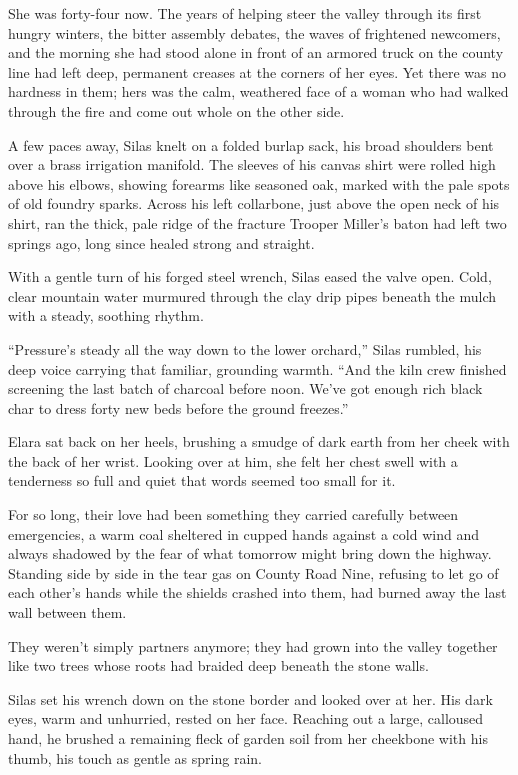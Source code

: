 She was forty-four now. The years of helping steer the valley through its first hungry winters, the bitter assembly debates, the waves of frightened newcomers, and the morning she had stood alone in front of an armored truck on the county line had left deep, permanent creases at the corners of her eyes. Yet there was no hardness in them; hers was the calm, weathered face of a woman who had walked through the fire and come out whole on the other side.

A few paces away, Silas knelt on a folded burlap sack, his broad shoulders bent over a brass irrigation manifold. The sleeves of his canvas shirt were rolled high above his elbows, showing forearms like seasoned oak, marked with the pale spots of old foundry sparks. Across his left collarbone, just above the open neck of his shirt, ran the thick, pale ridge of the fracture Trooper Miller’s baton had left two springs ago, long since healed strong and straight.

With a gentle turn of his forged steel wrench, Silas eased the valve open. Cold, clear mountain water murmured through the clay drip pipes beneath the mulch with a steady, soothing rhythm.

``Pressure’s steady all the way down to the lower orchard,'' Silas rumbled, his deep voice carrying that familiar, grounding warmth. ``And the kiln crew finished screening the last batch of charcoal before noon. We’ve got enough rich black char to dress forty new beds before the ground freezes.''

Elara sat back on her heels, brushing a smudge of dark earth from her cheek with the back of her wrist. Looking over at him, she felt her chest swell with a tenderness so full and quiet that words seemed too small for it.

For so long, their love had been something they carried carefully between emergencies, a warm coal sheltered in cupped hands against a cold wind and always shadowed by the fear of what tomorrow might bring down the highway. Standing side by side in the tear gas on County Road Nine, refusing to let go of each other's hands while the shields crashed into them, had burned away the last wall between them.

They weren't simply partners anymore; they had grown into the valley together like two trees whose roots had braided deep beneath the stone walls.

Silas set his wrench down on the stone border and looked over at her. His dark eyes, warm and unhurried, rested on her face. Reaching out a large, calloused hand, he brushed a remaining fleck of garden soil from her cheekbone with his thumb, his touch as gentle as spring rain.

